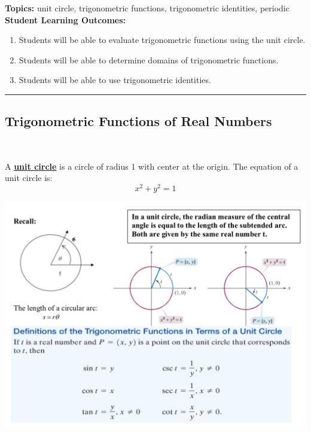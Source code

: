 
\noindent \textbf{Topics:}  unit circle, trigonometric functions, trigonometric identities, periodic\\

\noindent \textbf{Student Learning Outcomes:}
\begin{enumerate}
\item Students will be able to evaluate trigonometric functions using the unit circle.
\item Students will be able to determine domains of trigonometric functions.
\item Students will be able to use trigonometric identities.
\end{enumerate}

\hrule 

\bigskip

\subsection{Trigonometric Functions of Real Numbers} ~

\noindent A \textbf{\underline{unit circle}} is a circle of radius 1 with center at the origin.  The equation of a unit circle is:
$$x^2+y^2=1$$

\includegraphics[scale=.6]{unitpic}

\newpage









